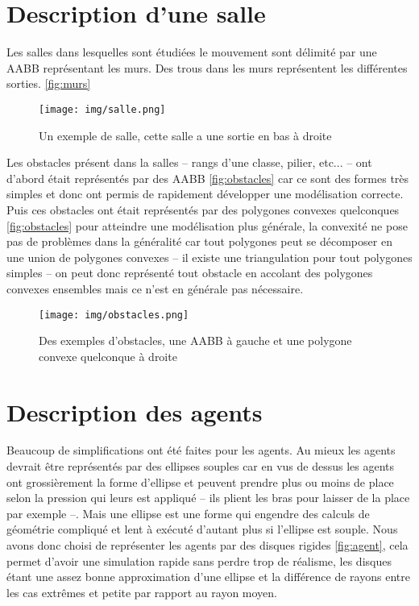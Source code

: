 \documentclass{article}
\begin{document}
\section{Description d'une salle}

Les salles dans lesquelles sont étudiées le mouvement sont délimité par
une AABB représentant les murs. Des trous dans les murs représentent les
différentes sorties. \autoref{fig:murs}

\begin{figure}[h]
  \texttt{[image: img/salle.png]}
  \caption{Un exemple de salle, cette salle a une sortie en bas à droite}
  \label{fig:murs}
\end{figure}

Les obstacles présent dans la salles -- rangs d'une classe, pilier, etc... --
ont d'abord était représentés par des AABB \autoref{fig:obstacles} car ce
sont des formes très simples
et donc ont permis de rapidement développer une modélisation correcte. Puis
ces obstacles ont était représentés par des polygones convexes quelconques
\autoref{fig:obstacles} pour atteindre une modélisation plus générale, la convexité
ne pose pas
de problèmes dans la généralité car tout polygones peut se décomposer en une
union de polygones convexes -- il existe une triangulation pour tout
polygones simples -- on peut donc représenté tout obstacle en accolant des
polygones convexes ensembles mais ce n'est en générale pas nécessaire.

\begin{figure}[h]
  \texttt{[image: img/obstacles.png]}
  \caption{Des exemples d'obstacles, une AABB à gauche et une polygone
    convexe quelconque à droite}
  \label{fig:obstacles}
\end{figure}


\section{Description des agents}

Beaucoup de simplifications ont été faites pour les agents. Au mieux les agents
devrait être représentés par des ellipses souples car en vus de dessus les agents
ont grossièrement la forme d'ellipse et peuvent prendre plus ou moins de place
selon la pression qui leurs est appliqué -- ils plient les bras pour laisser de
la place par exemple --. Mais une ellipse est une forme qui engendre des calculs
de géométrie compliqué et lent à exécuté d'autant plus si l'ellipse est souple.
Nous avons donc choisi de représenter les agents par des disques rigides \autoref{fig:agent},
cela permet d'avoir une simulation rapide sans perdre trop de réalisme, les
disques étant une assez bonne approximation d'une ellipse et la différence
de rayons entre les cas extrêmes et petite par rapport au rayon moyen.
\end{document}
